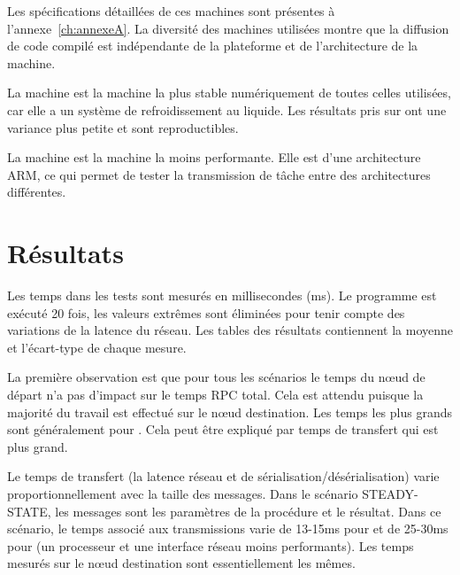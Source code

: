 Les spécifications détaillées de ces machines sont présentes à
l'annexe~\ref{ch:annexeA}. La diversité des machines utilisées montre que la
diffusion de code compilé est indépendante de la plateforme et de l'architecture de la
machine.

La machine \MMM[x86/Linux] est la machine la plus stable numériquement de toutes
celles utilisées, car elle a un système de refroidissement au liquide. Les résultats
pris sur \MMM[x86/Linux] ont une variance plus petite et sont reproductibles.

La machine  est la machine la moins performante. Elle est d'une
architecture ARM, ce qui permet de tester la transmission de tâche
entre des architectures différentes.

\section{Résultats}
Les temps dans les tests sont mesurés en millisecondes (ms).  Le programme est
exécuté 20 fois, les valeurs extrêmes sont éliminées pour tenir compte des
variations de la latence du réseau. Les tables des résultats contiennent
la moyenne et l'écart-type de chaque mesure.


La première observation est que pour tous les scénarios le temps du nœud de
départ n'a pas d'impact sur le temps RPC total. Cela est attendu puisque la
majorité du travail est effectué sur le nœud destination. Les temps les plus
grands sont généralement pour . Cela peut être expliqué par
temps de transfert qui est plus grand.

Le temps de transfert (la latence réseau et de sérialisation/désérialisation)
varie proportionnellement avec la taille des messages. Dans le scénario
STEADY-STATE, les messages sont les paramètres de la procédure et le résultat.
Dans ce scénario, le temps associé aux transmissions varie de 13-15ms pour
\MMM[x86/macOS] et de 25-30ms pour  (un processeur et une
interface réseau moins performants). Les temps mesurés sur le nœud destination
sont essentiellement les mêmes.

